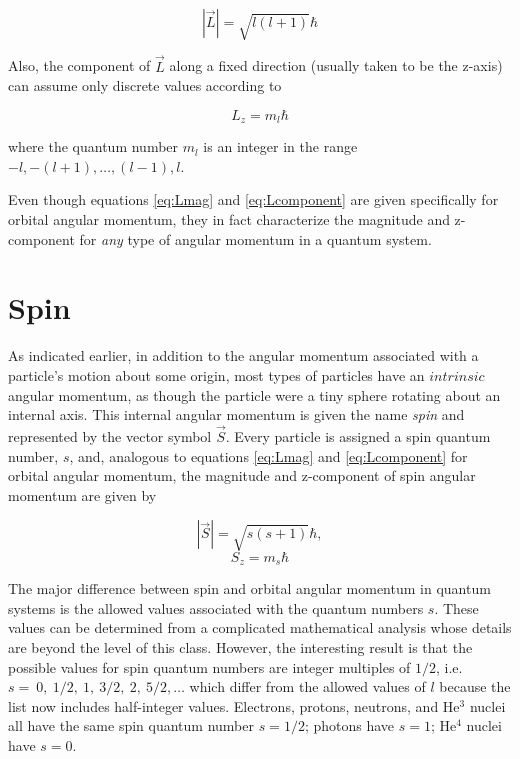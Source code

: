 \begin{equation}
|\vec{L}| = \sqrt{l(l+1)}\hbar
\label{eq:Lmag}
\end{equation}

Also, the component of $\vec{L}$ along a fixed direction (usually taken to be the z-axis) can assume only discrete values according to 

\begin{equation}
L_z = m_l \hbar
\label{eq:Lcomponent}
\end{equation}

\noindent where the quantum number $m_l$ is an integer in the range {$-l, -(l+1), \ldots, (l-1), l$}.

Even though equations \ref{eq:Lmag} and \ref{eq:Lcomponent} are given specifically for orbital angular momentum, they in fact characterize the magnitude and z-component for {\it any} type of angular momentum in a quantum system.

\section{Spin}

As indicated earlier, in addition to the angular momentum associated with a particle's motion about some origin, most types of particles have an $intrinsic$ angular momentum, as though the particle were a tiny sphere rotating about an internal axis.  This internal angular momentum is given the name {\it spin\/} and represented by the vector symbol $\vec{S}$.  Every particle is
assigned a spin quantum number, $s$, and, analogous to equations \ref{eq:Lmag} and \ref{eq:Lcomponent} for orbital angular momentum, the magnitude and z-component of spin angular momentum are given by

\begin{equation}
|\vec{S}| = \sqrt{s(s+1)}\hbar,
\end{equation}
\begin{equation}
S_z = m_s \hbar
\label{eq:Scomponent}
\end{equation}

The major difference between spin and orbital angular momentum in quantum systems is the allowed values associated with the quantum numbers $s$. These values can be determined from a complicated mathematical analysis
whose details are beyond the level of this class.  However, the interesting
result is that the possible values for spin quantum numbers are integer multiples of $1/2$, i.e. $s =~ 0, \ 1/2, \ 1, \ 3/2, \ 2, \ 5/2, \dots$ which differ from the allowed values of $l$ because the list now includes half-integer values.  Electrons, protons, neutrons,
and He$^3$ nuclei all have the same spin quantum number $s=1/2$; photons have $s=1$; He$^4$ nuclei have $s=0$.

